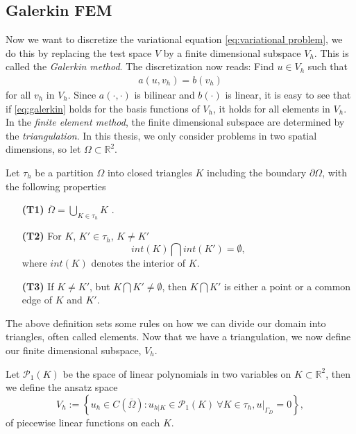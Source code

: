 \documentclass[../Main/main.tex]{subfiles}
\begin{document}
	\subsection{Galerkin FEM} \label{sec:galerkin_fem}

	Now we want to discretize the variational equation \eqref{eq:variational problem}, we do this by replacing the test space $V$ by a finite dimensional subspace $V_h$. This is called the \emph{Galerkin method}. The discretization now reads: Find $u \in V_h$ such that 
	\begin{equation}\label{eq:galerkin}
		\begin{gathered}
			a(u,v_h) = b(v_h) 
		\end{gathered}
	\end{equation}
	for all $v_h$ in $V_h$.
	Since $a(\cdot,\cdot)$ is bilinear and $b(\cdot)$ is linear, it is easy to see that if \eqref{eq:galerkin} holds for the basis functions of $V_h$, it holds for all elements in $V_h$. In the \emph{finite element method}, the finite dimensional subspace are determined by the \emph{triangulation}. In this thesis, we only consider problems in two spatial dimensions, so let $\Omega \subset \mathbb{R}^2$. 
	\begin{definition}
		Let $\tau_h$ be a partition $\Omega$ into closed triangles $K$ including the boundary $\partial \Omega$, with the following properties
		\begin{itemize}
			\item[\textbf{(T1)}] $\overline{\Omega} = \bigcup_{K\in \tau_h}K$ .
			\item[\textbf{(T2)}] For $K$, $K' \in \tau_h$, $K \neq K'$ \begin{equation*}
				int(K) \bigcap int(K')=\emptyset,
			\end{equation*} 
			where $int(K)$ denotes the interior of $K$.
			\item[\textbf{(T3)}] If $K\neq K'$, but $K\bigcap K' \neq \emptyset$, then $K\bigcap K'$ is either a point or a common edge of $K$ and $K'$.
			
		\end{itemize}
	\end{definition}
	The above definition sets some rules on how we can divide our domain into triangles, often called elements.
	Now that we have a triangulation, we now define our finite dimensional subspace, $V_h$.
	\begin{definition}\label{def:linear ansatz}
		Let $\mathcal{P}_1(K)$ be the space of linear polynomials in two variables on $K\subset \mathbb{R}^2$, then we define the ansatz space
		\begin{equation*}
			V_h := \left \{ u_h \in C(\overline{\Omega}) : u_{h|K} \in \mathcal{P}_1(K) \ \forall K \in \tau_h, u|_{\Gamma_D} = 0  \right \},
		\end{equation*}
		of piecewise linear functions on each $K$.
	\end{definition}
\end{document}
